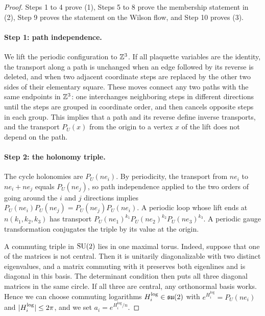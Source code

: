 \begin{proof}
Steps 1 to 4 prove (1), Steps 5 to 8 prove the membership statement in (2), Step 9 proves the statement on the Wilson flow, and Step 10 proves (3).

\paragraph{Step 1: path independence.}
We lift the periodic configuration to $\mathbb Z^3$. If all plaquette variables are the identity, the transport along a path is unchanged when an edge followed by its reverse is deleted, and when two adjacent coordinate steps are replaced by the other two sides of their elementary square. These moves connect any two paths with the same endpoints in $\mathbb Z^3$: one interchanges neighboring steps in different directions until the steps are grouped in coordinate order, and then cancels opposite steps in each group. This implies that a path and its reverse define inverse transports, and the transport $P_U(x)$ from the origin to a vertex $x$ of the lift does not depend on the path.

\paragraph{Step 2: the holonomy triple.}
The cycle holonomies are $P_U(ne_i)$. By periodicity, the transport from $ne_i$ to $ne_i+ne_j$ equals $P_U(ne_j)$, so path independence applied to the two orders of going around the $i$ and $j$ directions implies $P_U(ne_i)P_U(ne_j)=P_U(ne_j)P_U(ne_i)$. A periodic loop whose lift ends at $n(k_1,k_2,k_3)$ has transport $P_U(ne_1)^{k_1}P_U(ne_2)^{k_2}P_U(ne_3)^{k_3}$. A periodic gauge transformation conjugates the triple by its value at the origin.

A commuting triple in $\mathrm{SU}(2)$ lies in one maximal torus. Indeed, suppose that one of the matrices is not central. Then it is unitarily diagonalizable with two distinct eigenvalues, and a matrix commuting with it preserves both eigenlines and is diagonal in this basis. The determinant condition then puts all three diagonal matrices in the same circle. If all three are central, any orthonormal basis works. Hence we can choose commuting logarithms $H^{\log}_i\in\mathfrak{su}(2)$ with $e^{H^{\log}_i}=P_U(ne_i)$ and $\lvert H^{\log}_i\rvert\le2\pi$, and we set $a_i=e^{H^{\log}_i/n}$.


\end{proof}
